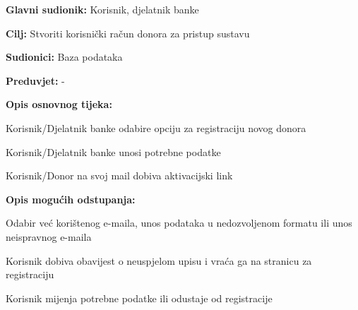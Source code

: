 \noindent {}
					\begin{packed_item}
	
						\item \textbf{Glavni sudionik: }Korisnik, djelatnik banke
						\item \textbf{Cilj:} Stvoriti korisnički račun donora za pristup sustavu
						\item \textbf{Sudionici:} Baza podataka
						\item \textbf{Preduvjet:} -
						\item \textbf{Opis osnovnog tijeka:}
						
						\item[] \begin{packed_enum}
	
							\item Korisnik/Djelatnik banke odabire opciju za registraciju novog donora
							\item Korisnik/Djelatnik banke unosi potrebne podatke
							\item Korisnik/Donor na svoj mail dobiva aktivacijski link
							
						\end{packed_enum}
						
						\item  \textbf{Opis mogućih odstupanja:}
						
						\item[] \begin{packed_item}
	
							\item[2.a] Odabir već korištenog e-maila, unos podataka u nedozvoljenom formatu ili unos neispravnog e-maila
							\item[] \begin{packed_enum}
								
								\item Korisnik dobiva obavijest o neuspjelom upisu i vraća ga na stranicu za registraciju
								\item Korisnik mijenja potrebne podatke ili odustaje od registracije
								
							\end{packed_enum}
							
							
						\end{packed_item}
					\end{packed_item}
\eject 
\noindent {}
